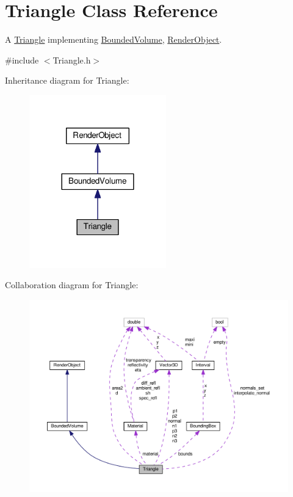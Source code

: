 \hypertarget{classTriangle}{}\section{Triangle Class Reference}
\label{classTriangle}


A \hyperlink{classTriangle}{Triangle} implementing \hyperlink{classBoundedVolume}{Bounded\+Volume}, \hyperlink{classRenderObject}{Render\+Object}.  




{\ttfamily \#include $<$Triangle.\+h$>$}



Inheritance diagram for Triangle\+:\nopagebreak
\begin{figure}[H]
\begin{center}
\leavevmode
\includegraphics[width=168pt]{classTriangle__inherit__graph}
\end{center}
\end{figure}


Collaboration diagram for Triangle\+:
\nopagebreak
\begin{figure}[H]
\begin{center}
\leavevmode
\includegraphics[width=350pt]{classTriangle__coll__graph}
\end{center}
\end{figure}
